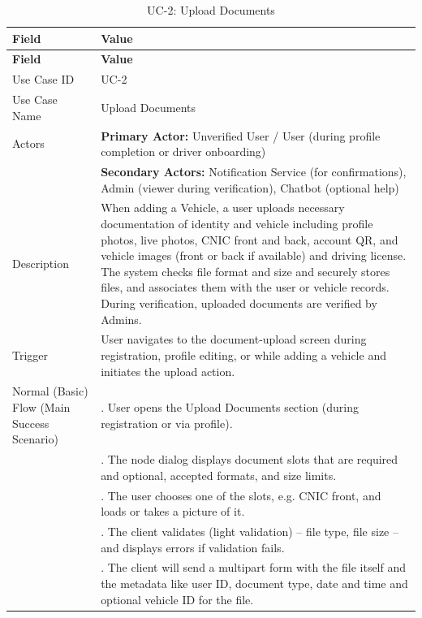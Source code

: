 \begin{longtable}{|>{\raggedright\arraybackslash}p{4cm}|>{\raggedright\arraybackslash}p{11cm}|}
\caption{UC-2: Upload Documents}
\label{tab:uc-2} \\
\hline
\rowcolor{lightgray!30}
\textbf{Field} & \textbf{Value} \\
\hline
\endfirsthead
\hline
\rowcolor{lightgray!30}
\textbf{Field} & \textbf{Value} \\
\hline
\endhead
\hline
\endfoot
\hline
\endlastfoot
Use Case ID & UC-2 \\
\hline
Use Case Name & Upload Documents \\
\hline
Actors & \textbf{Primary Actor:} Unverified User / User (during profile completion or driver onboarding) \\
& \textbf{Secondary Actors:} Notification Service (for confirmations), Admin (viewer during verification), Chatbot (optional help) \\
\hline
Description & When adding a Vehicle, a user uploads necessary documentation of identity and vehicle including profile photos, live photos, CNIC front and back, account QR, and vehicle images (front or back if available) and driving license. The system checks file format and size and securely stores files, and associates them with the user or vehicle records. During verification, uploaded documents are verified by Admins. \\
\hline
Trigger & User navigates to the document-upload screen during registration, profile editing, or while adding a vehicle and initiates the upload action. \\
\hline
Normal (Basic) Flow (Main Success Scenario) & 1. User opens the Upload Documents section (during registration or via profile). \\
& 2. The node dialog displays document slots that are required and optional, accepted formats, and size limits. \\
& 3. The user chooses one of the slots, e.g. CNIC front, and loads or takes a picture of it. \\
& 4. The client validates (light validation) – file type, file size – and displays errors if validation fails. \\
& 5. The client will send a multipart form with the file itself and the metadata like user ID, document type, date and time and optional vehicle ID for the file. \\

\end{longtable}
